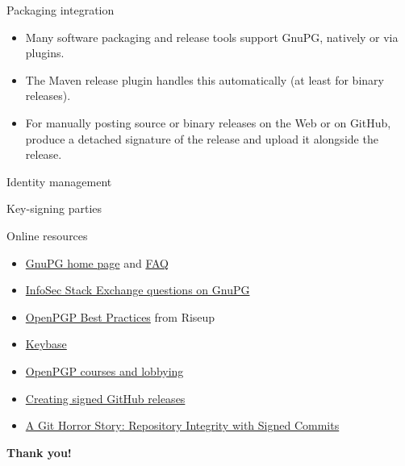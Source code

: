 \documentclass[
mode=present,
paper=smartboard,
size=20pt,
]{powerdot}
\begin{document}
\begin{slide}{Packaging integration}
  \begin{itemize}
  \item Many software packaging and release tools support GnuPG,
    natively or via plugins.
  \item The Maven release plugin handles this automatically (at least
    for binary releases).
  \item For manually posting source or binary releases on the Web or
    on GitHub, produce a detached signature of the release and upload
    it alongside the release.
  \end{itemize}
\end{slide}

\begin{slide}{Identity management}
\end{slide}

\begin{slide}{Key-signing parties}
  
\end{slide}

\begin{slide}{Online resources}
  \begin{itemize}
  \item \href{https://gnupg.org/}{GnuPG home page} and \href{https://www.gnupg.org/faq/gnupg-faq.html}{FAQ}
  \item \href{http://security.stackexchange.com/questions/tagged/gnupg}{InfoSec Stack Exchange questions on GnuPG}
  \item \href{https://riseup.net/en/security/message-security/openpgp/best-practices}{OpenPGP Best Practices} from Riseup
  \item \href{https://keybase.io/}{Keybase}
  \item \href{http://www.openpgp-courses.org/}{OpenPGP courses and lobbying}
  \item
    \href{https://wiki.debian.org/Creating\%20signed\%20GitHub\%20releases}{Creating
      signed GitHub releases}
  \item \href{https://mikegerwitz.com/papers/git-horror-story}{A Git
      Horror Story: Repository Integrity with Signed Commits}
  \end{itemize}
\end{slide}

\begin{slide}[toc=]{}
\centering

\vfill

{\huge \textbf{Thank you!}}

\vfill

\mbox{}
\end{slide}
\end{document}
